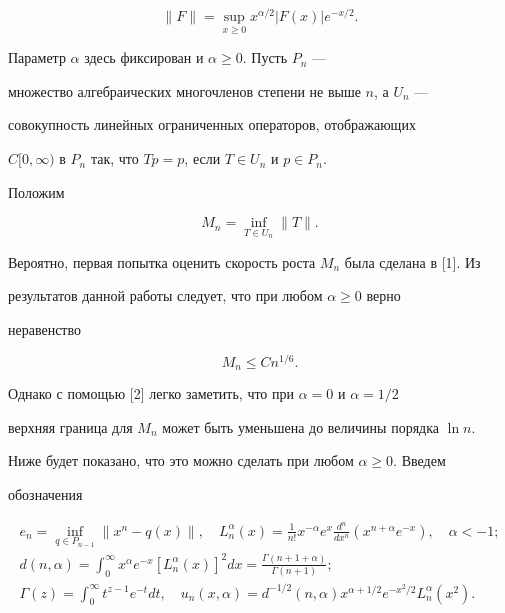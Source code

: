 $$


\| F\|=\sup_{x\geq0} x^{\alpha/2}


| F(x)| e^{-x/2}.


$$


Параметр $\alpha$ здесь фиксирован и $\alpha\geq0$. Пусть $P_n$  ---


множество алгебраических многочленов степени не выше $n$, а $U_n$ ---


совокупность линейных ограниченных операторов, отображающих


$C[0,\infty)$ в $P_n$ так, что $Tp=p$, если $T\in{U_n}$ и $p\in{P_n}$.


Положим 


$$


M_n=\inf_{T\in{U_n}}\| T\|.


$$ 


Вероятно, первая попытка оценить скорость роста $M_n$ была сделана в [1]. Из


результатов данной работы следует, что при любом $\alpha\geq0$ верно


неравенство 


$$


M_n\leq{Cn^{1/6}}.


$$ 


Однако с помощью [2] легко заметить, что при $\alpha=0$ и $\alpha=1/2$ 


верхняя граница для $M_n$ может быть уменьшена до величины порядка $\ln n$. 


Ниже будет показано, что это можно сделать при любом $\alpha\geq0$. Введем


обозначения 


\begin{gather*} 


e_n=\inf_{q\in{P_{n-1}}}\| x^n-q(x)\|,\quad


L^\alpha_n(x)=\frac{1}{n!}{x^{-\alpha}}{e^x}


\frac{d^n}{dx^n}(x^{n+\alpha}e^{-x}),\quad


\alpha<-1; \\


%


d(n,\alpha)=\int_0^\infty {x^\alpha}e^{-x}{[L^\alpha_n(x)]^2}dx=


\frac{\Gamma(n+1+\alpha)}{\Gamma(n+1)}; \\


%


\Gamma(z)=\int_0^\infty {t^{z-1}e^{-t}}dt,\quad u_n(x,\alpha)=


d^{-1/2}{(n,\alpha)}x^{\alpha+1/2}e^{-x^2/2}L^\alpha_n(x^2).


\end{gather*}


